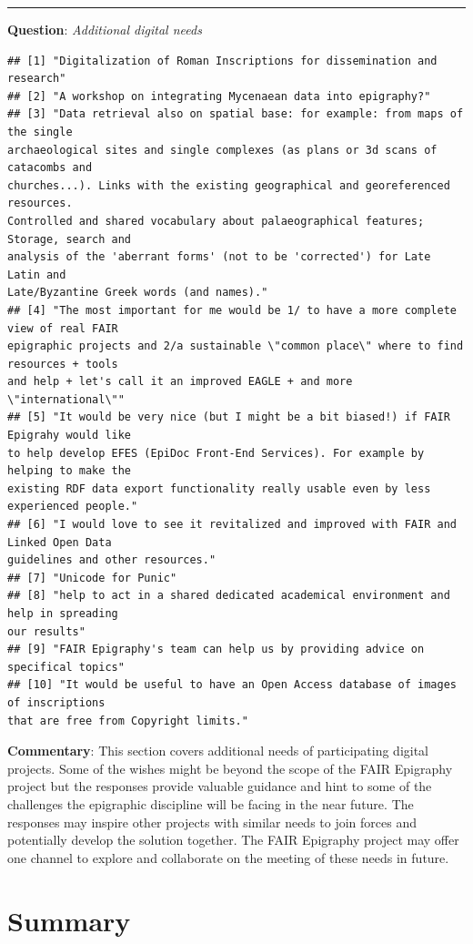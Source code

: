 \documentclass[
  12pt,
]{scrreprt}
\begin{document}
\begin{center}\rule{0.5\linewidth}{0.5pt}\end{center}

\textbf{Question}: \emph{Additional digital needs}

\begin{verbatim}
## [1] "Digitalization of Roman Inscriptions for dissemination and research"
## [2] "A workshop on integrating Mycenaean data into epigraphy?"
## [3] "Data retrieval also on spatial base: for example: from maps of the single
archaeological sites and single complexes (as plans or 3d scans of catacombs and
churches...). Links with the existing geographical and georeferenced resources.
Controlled and shared vocabulary about palaeographical features; Storage, search and
analysis of the 'aberrant forms' (not to be 'corrected') for Late Latin and
Late/Byzantine Greek words (and names)."
## [4] "The most important for me would be 1/ to have a more complete view of real FAIR
epigraphic projects and 2/a sustainable \"common place\" where to find resources + tools
and help + let's call it an improved EAGLE + and more \"international\""
## [5] "It would be very nice (but I might be a bit biased!) if FAIR Epigrahy would like
to help develop EFES (EpiDoc Front-End Services). For example by helping to make the
existing RDF data export functionality really usable even by less experienced people."
## [6] "I would love to see it revitalized and improved with FAIR and Linked Open Data
guidelines and other resources."
## [7] "Unicode for Punic"
## [8] "help to act in a shared dedicated academical environment and help in spreading
our results"
## [9] "FAIR Epigraphy's team can help us by providing advice on specifical topics"
## [10] "It would be useful to have an Open Access database of images of inscriptions
that are free from Copyright limits."
\end{verbatim}

\textbf{Commentary}: This section covers additional needs of
participating digital projects. Some of the wishes might be beyond the
scope of the FAIR Epigraphy project but the responses provide valuable
guidance and hint to some of the challenges the epigraphic discipline
will be facing in the near future. The responses may inspire other
projects with similar needs to join forces and potentially develop the
solution together. The FAIR Epigraphy project may offer one channel to
explore and collaborate on the meeting of these needs in future.

\hypertarget{summary}{%
\chapter{Summary}\label{summary}}
\end{document}
